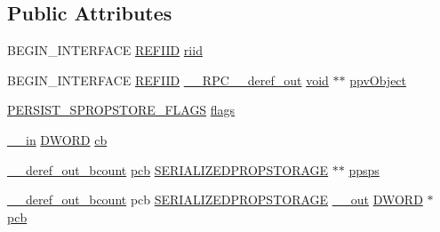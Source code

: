 \subsection*{Public Attributes}
\begin{DoxyCompactItemize}
\item 
B\+E\+G\+I\+N\+\_\+\+I\+N\+T\+E\+R\+F\+A\+CE \hyperlink{px__win__ds_8c_a80ec49c8ae61e234197d5071d2df497d}{R\+E\+F\+I\+ID} \hyperlink{struct_i_persist_serialized_prop_storage_vtbl_aeede399dabe059f99222aec74b910ab1}{riid}
\item 
B\+E\+G\+I\+N\+\_\+\+I\+N\+T\+E\+R\+F\+A\+CE \hyperlink{px__win__ds_8c_a80ec49c8ae61e234197d5071d2df497d}{R\+E\+F\+I\+ID} \hyperlink{rpcsal_8h_a23bc188526f10656f9c79d950f6c3192}{\+\_\+\+\_\+\+R\+P\+C\+\_\+\+\_\+deref\+\_\+out} \hyperlink{sound_8c_ae35f5844602719cf66324f4de2a658b3}{void} $\ast$$\ast$ \hyperlink{struct_i_persist_serialized_prop_storage_vtbl_a33619eb247144134901782eb7adcf2b3}{ppv\+Object}
\item 
\hyperlink{propsys_8h_a383cbd50dc29b02d093e30166a3934bf}{P\+E\+R\+S\+I\+S\+T\+\_\+\+S\+P\+R\+O\+P\+S\+T\+O\+R\+E\+\_\+\+F\+L\+A\+GS} \hyperlink{struct_i_persist_serialized_prop_storage_vtbl_a62dd2f900f31ca83f7e51f8cf6821ce9}{flags}
\item 
\hyperlink{sal_8h_a3f6b8655e1aa9dfc15a9029f0343009e}{\+\_\+\+\_\+in} \hyperlink{mapinls_8h_ad342ac907eb044443153a22f964bf0af}{D\+W\+O\+RD} \hyperlink{struct_i_persist_serialized_prop_storage_vtbl_ab316f88cbbf87f4e4737aef460bbf94e}{cb}
\item 
\hyperlink{sal_8h_a775e3aa641b319cf4cdc211f403faae2}{\+\_\+\+\_\+deref\+\_\+out\+\_\+bcount} \hyperlink{struct_i_persist_serialized_prop_storage_vtbl_a0983d30093a69311488a4ead7e009eec}{pcb} \hyperlink{propsys_8h_a6baa591b1f6004fae90b711fad5dbe12}{S\+E\+R\+I\+A\+L\+I\+Z\+E\+D\+P\+R\+O\+P\+S\+T\+O\+R\+A\+GE} $\ast$$\ast$ \hyperlink{struct_i_persist_serialized_prop_storage_vtbl_a05cbca3f5fed0fdfc60d544fa9425ee4}{ppsps}
\item 
\hyperlink{sal_8h_a775e3aa641b319cf4cdc211f403faae2}{\+\_\+\+\_\+deref\+\_\+out\+\_\+bcount} pcb \hyperlink{propsys_8h_a6baa591b1f6004fae90b711fad5dbe12}{S\+E\+R\+I\+A\+L\+I\+Z\+E\+D\+P\+R\+O\+P\+S\+T\+O\+R\+A\+GE} \hyperlink{sal_8h_abb4c3c1135aab6c47cff22e7c16efb74}{\+\_\+\+\_\+out} \hyperlink{mapinls_8h_ad342ac907eb044443153a22f964bf0af}{D\+W\+O\+RD} $\ast$ \hyperlink{struct_i_persist_serialized_prop_storage_vtbl_a0983d30093a69311488a4ead7e009eec}{pcb}
\end{DoxyCompactItemize}


